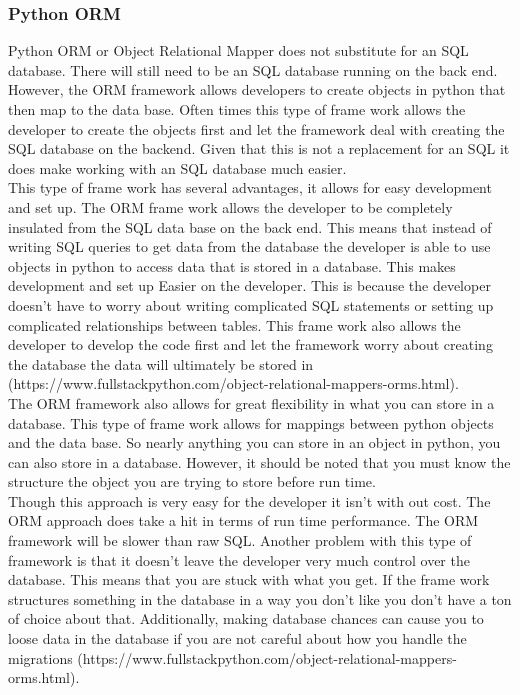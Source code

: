 \documentclass[letterpaper,10pt]{article}
\begin{document}
		\subsubsection{Python ORM}
				Python ORM or Object Relational Mapper does not substitute for an SQL database. There will still need to be an SQL database running on the back end. However, the ORM framework allows developers to create objects in python that then map to the data base. Often times this type of frame work allows the developer to create the objects first and let the framework deal with creating the SQL database on the backend. Given that this is not a replacement for an SQL it does make working with an SQL database much easier.\\
				This type of frame work has several advantages, it allows for easy development and set up. The ORM frame work allows the developer to be completely insulated from the SQL data base on the back end. This means that instead of writing SQL queries to get data from the database the developer is able to use objects in python to access data that is stored in a database. This makes development and set up Easier on the developer. This is because the developer doesn't have to worry about writing complicated SQL statements or setting up complicated relationships between tables. This frame work also allows the developer to develop the code first and let the framework worry about creating the database the data will ultimately be stored in (https://www.fullstackpython.com/object-relational-mappers-orms.html).\\
				The ORM framework also allows for great flexibility in what you can store in a database. This type of frame work allows for mappings between python objects and the data base. So nearly anything you can store in an object in python, you can also store in a database. However, it should be noted that you must know the structure the object you are trying to store before run time.\\
				Though this approach is very easy for the developer it isn't with out cost. The ORM approach does take a hit in terms of run time performance. The ORM framework will be slower than raw SQL. Another problem with this type of framework is that it doesn’t leave the developer very much control over the database. This means that you are stuck with what you get. If the frame work structures something in the database in a way you don't like you don't have a ton of choice about that. Additionally, making database chances can cause you to loose data in the database if you are not careful about how you handle the migrations (https://www.fullstackpython.com/object-relational-mappers-orms.html).\\
				
\end{document}
